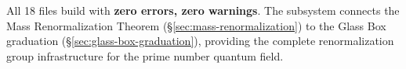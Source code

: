 All 18 files build with \textbf{zero errors, zero warnings}.
The subsystem connects the Mass Renormalization Theorem
(\S\ref{sec:mass-renormalization}) to the Glass Box graduation
(\S\ref{sec:glass-box-graduation}), providing the complete
renormalization group infrastructure for the prime number quantum field.
